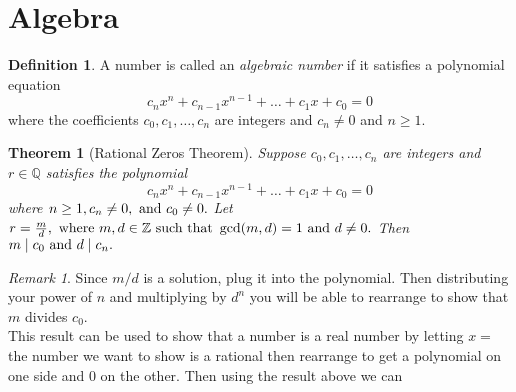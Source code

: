 \documentclass{article}
\newtheorem{theorem}{Theorem}[section]
\theoremstyle{definition}
\newtheorem{definition}{Definition}[section]
\theoremstyle{remark}
\newtheorem{remark}{Remark}[section]
\begin{document}


\section{Algebra}












\begin{definition}\label{def:algebraic number}
A number is called an \textit{algebraic number} if it satisfies a polynomial equation
\[
c_nx^n + c_{n-1}x^{n-1} + \dotsc + c_1x + c_0 = 0
\]
where the coefficients \(c_0, c_1, \dots, c_n\) are integers and \(c_n \neq 0\) and \(n \geq 1.\)
\end{definition}























\begin{theorem}[Rational Zeros Theorem]\label{thm:rational zeros theorem}
Suppose \(c_0, c_1, \dots , c_n \) are integers and \( r \in \mathbb{Q}\) satisfies the polynomial
\[
c_nx^n + c_{n-1}x^{n-1} + \dotsc + c_1x + c_0 = 0
\]
where \(n \geq 1, c_n \neq 0, \textnormal{ and } c_0 \neq 0.\) Let \(r = \frac{m}{d}, \textnormal{ where } m, d \in \mathbb{Z} \textnormal{ such that } \gcd(m,d) = 1 \textnormal{ and } d \neq 0.\) Then \(m\mid c_0 \textnormal{ and } d \mid c_n.\) 
\end{theorem}

\begin{remark}
Since $m/d$ is a solution, plug it into the polynomial. Then distributing your
power of $n$ and multiplying by $d^n$ you will be able to rearrange to show 
that $m$ divides $c_0$.\\
This result can be used to show that a number is a real number by letting
$x=$ the number we want to show is a rational then rearrange to get a polynomial on one 
side and 0 on the other. Then using the result above we can 
\end{remark}
\end{document}
